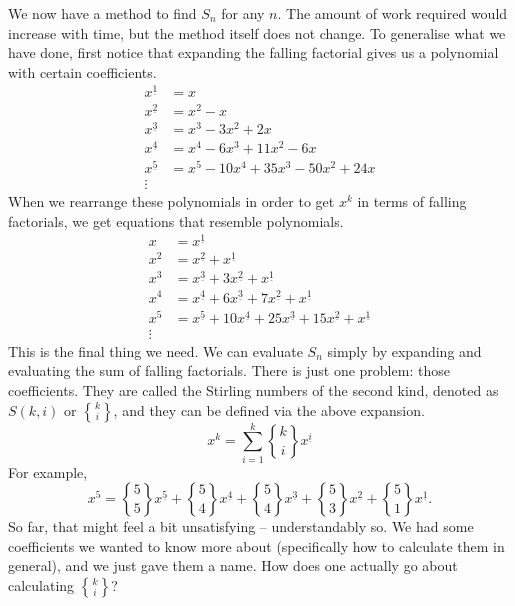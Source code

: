 \documentclass[a4paper]{article}
\theoremstyle{definition}
\begin{document}
We now have a method to find $S_n$ for any $n$.
The amount of work required would increase with time, but the method itself does not change.
To generalise what we have done, first notice that expanding the falling factorial gives us a polynomial with certain coefficients.
\begin{align*}
    x^{\underline{1}} & = x                                     \\
    x^{\underline{2}} & = x^2 - x                               \\
    x^{\underline{3}} & = x^3 - 3x^2 + 2x                       \\
    x^{\underline{4}} & = x^{4} - 6 x^3 + 11 x^2 - 6 x          \\
    x^{\underline{5}} & = x^5 - 10 x^4 + 35 x^3 - 50 x^2 + 24 x \\
    \vdots
\end{align*}
When we rearrange these polynomials in order to get $x^k$ in terms of falling factorials, we get equations that resemble polynomials.
\begin{align*}
    x   & = x^{\underline{1}}                                                                                          \\
    x^2 & = x^{\underline{2}} + x^{\underline{1}}                                                                      \\
    x^3 & = x^{\underline{3}} + 3 x^{\underline{2}} + x^{\underline{1}}                                                \\
    x^4 & = x^{\underline{4}} + 6 x^{\underline{3}} + 7 x^{\underline{2}} + x^{\underline{1}}                          \\
    x^5 & = x^{\underline{5}} + 10 x^{\underline{4}} + 25 x^{\underline{3}} + 15 x^{\underline{2}} + x^{\underline{1}} \\
    \vdots
\end{align*}
This is the final thing we need.
We can evaluate $S_n$ simply by expanding and evaluating the sum of falling factorials.
There is just one problem: those coefficients.
They are called the Stirling numbers of the second kind, denoted as $S(k, i)$ or $k\brace i$, and they can be defined via the above expansion.
\begin{equation}
    x^k = \sum_{i=1}^k {k\brace i} x^{\underline{i}}
\end{equation}
For example,
\begin{equation*}
    x^5 = {5\brace 5} x^{\underline{5}} + {5\brace 4} x^{\underline{4}} + {5\brace 4} x^{\underline{3}} + {5\brace 3} x^{\underline{2}} + {5\brace 1} x^{\underline{1}}.
\end{equation*}
So far, that might feel a bit unsatisfying -- understandably so.
We had some coefficients we wanted to know more about (specifically how to calculate them in general), and we just gave them a name.
How does one actually go about calculating $k\brace i$?
\end{document}
